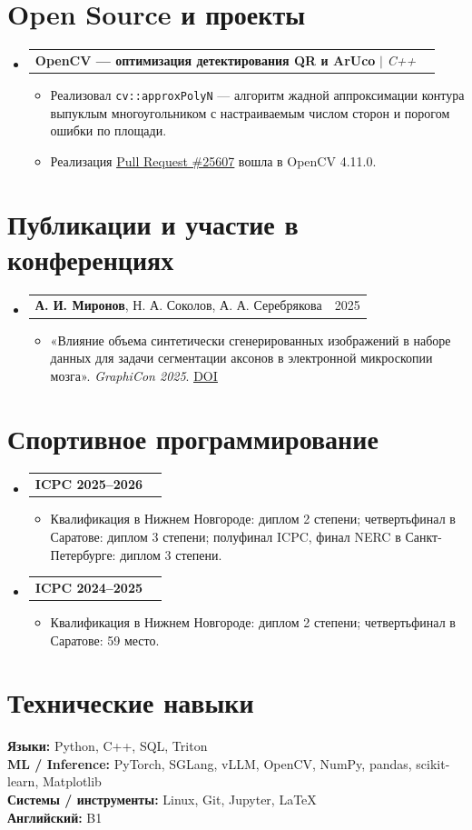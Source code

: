 \documentclass[letterpaper,10pt]{article}
\makeatletter
\newcommand{\resumeItem}[1]{\item\small{#1\vspace{-1pt}}}
\newcommand{\resumeProjectHeading}[2]{
  \item
  \begin{tabular*}{0.98\textwidth}{l@{\extracolsep{\fill}}r}
    \small #1 & \small #2 \\
  \end{tabular*}\vspace{-6pt}
}
\newcommand{\resumeSubHeadingListStart}{\begin{itemize}[leftmargin=0.14in,label={}]}
\newcommand{\resumeSubHeadingListEnd}{\end{itemize}}
\newcommand{\resumeItemListStart}{\begin{itemize}[leftmargin=0.22in,itemsep=1pt,topsep=2pt]}
\newcommand{\resumeItemListEnd}{\end{itemize}\vspace{-5pt}}
\makeatother
\begin{document}
\section{Open Source и проекты}
\resumeSubHeadingListStart
  \resumeProjectHeading
    {\textbf{OpenCV --- оптимизация детектирования QR и ArUco} $|$ \emph{C++}}{}
  \resumeItemListStart
    \resumeItem{Реализовал \texttt{cv::approxPolyN} --- алгоритм жадной аппроксимации контура выпуклым многоугольником с настраиваемым числом сторон и порогом ошибки по площади.}
    \resumeItem{Реализация \href{https://github.com/opencv/opencv/pull/25607}{\underline{Pull Request \#25607}} вошла в OpenCV 4.11.0.}
  \resumeItemListEnd
\resumeSubHeadingListEnd

\section{Публикации и участие в конференциях}
\resumeSubHeadingListStart
  \resumeProjectHeading
    {\textbf{А. И. Миронов}, Н. А. Соколов, А. А. Серебрякова}{2025}
  \resumeItemListStart
    \resumeItem{«Влияние объема синтетически сгенерированных изображений в наборе данных для задачи сегментации аксонов в электронной микроскопии мозга». \textit{GraphiCon 2025}. \href{https://doi.org/10.25686/978-5-8158-2474-4-2025-828-834}{\underline{DOI}}}
  \resumeItemListEnd
\resumeSubHeadingListEnd

\section{Спортивное программирование}
\resumeSubHeadingListStart
  \resumeProjectHeading{\textbf{ICPC 2025--2026}}{}
  \resumeItemListStart
    \resumeItem{Квалификация в Нижнем Новгороде: диплом 2 степени; четвертьфинал в Саратове: диплом 3 степени; полуфинал ICPC, финал NERC в Санкт-Петербурге: диплом 3 степени.}
  \resumeItemListEnd
  \resumeProjectHeading{\textbf{ICPC 2024--2025}}{}
  \resumeItemListStart
    \resumeItem{Квалификация в Нижнем Новгороде: диплом 2 степени; четвертьфинал в Саратове: 59 место.}
  \resumeItemListEnd
\resumeSubHeadingListEnd

\section{Технические навыки}
\begin{itemize}[leftmargin=0.14in,label={}]
  \small{\item{
    \textbf{Языки:} Python, C++, SQL, Triton \\
    \textbf{ML / Inference:} PyTorch, SGLang, vLLM, OpenCV, NumPy, pandas, scikit-learn, Matplotlib \\
    \textbf{Системы / инструменты:} Linux, Git, Jupyter, LaTeX \\
    \textbf{Английский:} B1
  }}
\end{itemize}
\end{document}
